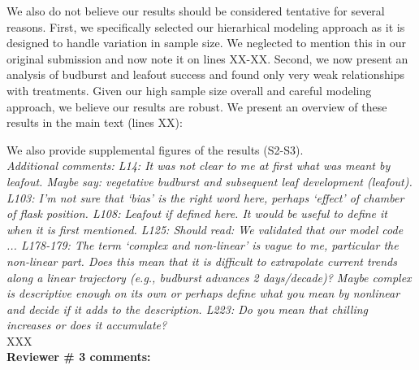 \documentclass[11pt,a4paper]{article}
\begin{document}
We also do not believe our results should be considered tentative for several reasons. First, we specifically selected our hierarhical modeling approach as it is designed to handle variation in sample size. We neglected to mention this in our original submission and now note it on lines XX-XX. Second, we now present an analysis of budburst and leafout success and found only very weak relationships with treatments. Given our high sample size overall and careful modeling approach, we believe our results are robust. We present an overview of these results in the main text (lines XX):

\begin{quote}
\end{quote}

We also provide supplemental figures of the results (S2-S3). \\


\emph{Additional comments:
L14: It was not clear to me at first what was meant by leafout. Maybe say: vegetative
budburst and subsequent leaf development (leafout).
L103: I’m not sure that ‘bias’ is the right word here, perhaps ‘effect’ of chamber of flask
position.
L108: Leafout if defined here. It would be useful to define it when it is first mentioned.
L125:  Should read: We validated that our model code ...
L178-179: The term ‘complex and non-linear’ is vague to me, particular the non-linear part.
Does this mean that it is difficult to extrapolate current trends along a linear trajectory
(e.g., budburst advances 2 days/decade)?  Maybe complex is descriptive enough on its own or
perhaps define what you mean by nonlinear and decide if it adds to the description.
L223: Do you mean that chilling increases or does it accumulate?}\\

XXX \\


{\bf Reviewer \# 3 comments:} \\
\end{document}
